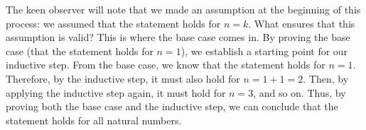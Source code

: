 The keen observer will note that we made an assumption at the beginning of this process: we assumed 
that the statement holds for $n=k$. What ensures that this assumption is valid? This is where the base case comes in.
By proving the base case (that the statement holds for $n=1$), we establish a starting point for our inductive step.
From the base case, we know that the statement holds for $n=1$. Therefore, by the inductive step, it must also hold for $n=1+1=2$.
Then, by applying the inductive step again, it must hold for $n=3$, and so on. Thus, by proving both the base case and the inductive step,
we can conclude that the statement holds for all natural numbers.   